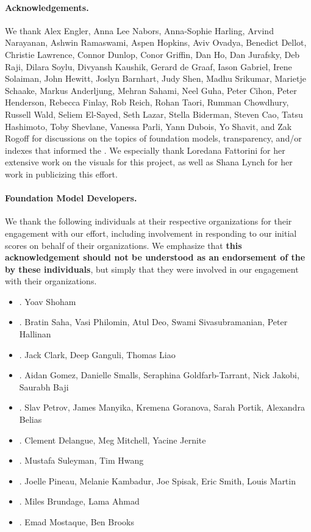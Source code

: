 \paragraph{Acknowledgements.}
We thank Alex Engler, Anna Lee Nabors, Anna-Sophie Harling, Arvind Narayanan, Ashwin Ramaswami, Aspen Hopkins, Aviv Ovadya, Benedict Dellot, Christie Lawrence, Connor Dunlop, Conor Griffin, Dan Ho, Dan Jurafsky, Deb Raji, Dilara Soylu, Divyansh Kaushik, Gerard de Graaf, Iason Gabriel, Irene Solaiman, John Hewitt, Joslyn Barnhart, Judy Shen, Madhu Srikumar, Marietje Schaake, Markus Anderljung, Mehran Sahami, Neel Guha, Peter Cihon, Peter Henderson, Rebecca Finlay, Rob Reich, Rohan Taori, Rumman Chowdhury, Russell Wald, Seliem El-Sayed, Seth Lazar, Stella Biderman, Steven Cao, Tatsu Hashimoto, Toby Shevlane, Vanessa Parli, Yann Dubois, Yo Shavit, and Zak Rogoff for discussions on the topics of foundation models, transparency, and/or indexes that informed the \projectname. 
We especially thank Loredana Fattorini for her extensive work on the visuals for this project, as well as Shana Lynch for her work in publicizing this effort.

\paragraph{Foundation Model Developers.}
We thank the following individuals at their respective organizations for their engagement with our effort, including involvement in responding to our initial scores on behalf of their organizations. 
We emphasize that \textbf{this acknowledgement should not be understood as an endorsement of the \projectname by these individuals}, but simply that they were involved in our engagement with their organizations.
\begin{itemize}
    \item \aitwentyone. Yoav Shoham
    \item \amazon. Bratin Saha, Vasi Philomin, Atul Deo, Swami Sivasubramanian, Peter Hallinan
    \item \anthropic. Jack Clark, Deep Ganguli, Thomas Liao
    \item \cohere. Aidan Gomez, Danielle Smalls, Seraphina Goldfarb-Tarrant, Nick Jakobi, Saurabh Baji
    \item \google. Slav Petrov, James Manyika, Kremena Goranova, Sarah Portik, Alexandra Belias 
    \item \huggingface. Clement Delangue, Meg Mitchell, Yacine Jernite
    \item \inflection. Mustafa Suleyman, Tim Hwang
    \item \meta. Joelle Pineau, Melanie Kambadur, Joe Spisak, Eric Smith, Louis Martin
    \item \openai. Miles Brundage, Lama Ahmad
    \item \stability. Emad Mostaque, Ben Brooks
\end{itemize}

